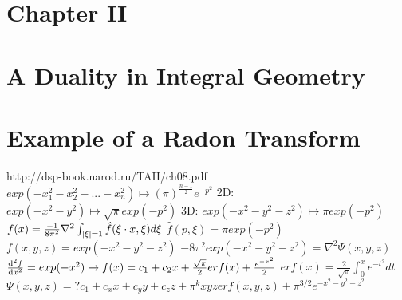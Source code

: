 \documentclass[14pt]{extarticle}
\begin{document}
\begin{outline}
	\section*{Chapter II}
	\section*{A Duality in Integral Geometry}

	\section*{Example of a Radon Transform}
		\1	http://dsp-book.narod.ru/TAH/ch08.pdf
		\1	$exp(-x_1^2 - x_2^2 - ... - x_n^2) \mapsto (\pi)^{\frac{n-1}{2}	} e^{-p^2}$
			\2	2D: $exp(-x^2 - y^2) \mapsto \sqrt{\pi} exp(-p^2)$
			\2	3D: $exp(-x^2 - y^2 - z^2) \mapsto \pi exp(-p^2)$
		\1	$f(x) = \frac{-1}{8\pi^2} \nabla^2 \int_{\abs{\xi} = 1} \hat{f}(\xi \cdot x, \xi) d\xi$
			\2	$\hat{f}(p,\xi) = \pi exp(-p^2)$
			\2  $f(x,y,z) = exp(-x^2 - y^2 - z^2)$
			\2	$-8\pi^2 exp(-x^2 - y^2 - z^2) = \nabla^2 \Psi(x,y,z)$
			\2	$\od[2]{f}{x} = exp(-x^2) \rightarrow f(x) = c_1 + c_2 x + \frac{\sqrt{\pi}}{2}erf(x) + \frac{e^{-x^2}}{2}$
				\3	$erf(x) = \frac{2}{\sqrt{\pi}}\int_0^x e^{-t^2}dt$
			\2	$\Psi(x,y,z) =? c_1 + c_xx + c_yy + c_zz +
						\pi^kxyzerf(x,y,z) + \pi^{3/2} e^{-x^2 - y^2 - z^2}$
	\end{outline}
\end{document}
